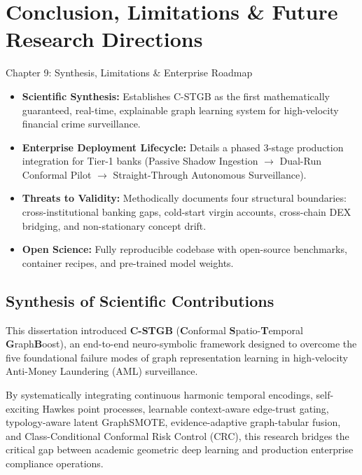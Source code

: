 \chapter{Conclusion, Limitations \& Future Research Directions}
\label{ch:conclusion}

\begin{takeawaybox}{Chapter 9: Synthesis, Limitations \& Enterprise Roadmap}
\begin{itemize}\setlength{\itemsep}{1pt}
  \item \textbf{Scientific Synthesis:} Establishes C-STGB as the first mathematically guaranteed, real-time, explainable graph learning system for high-velocity financial crime surveillance.
  \item \textbf{Enterprise Deployment Lifecycle:} Details a phased 3-stage production integration for Tier-1 banks (Passive Shadow Ingestion $\rightarrow$ Dual-Run Conformal Pilot $\rightarrow$ Straight-Through Autonomous Surveillance).
  \item \textbf{Threats to Validity:} Methodically documents four structural boundaries: cross-institutional banking gaps, cold-start virgin accounts, cross-chain DEX bridging, and non-stationary concept drift.
  \item \textbf{Open Science:} Fully reproducible codebase with open-source benchmarks, container recipes, and pre-trained model weights.
\end{itemize}
\end{takeawaybox}


\section{Synthesis of Scientific Contributions}
This dissertation introduced \textbf{C-STGB} (\textbf{C}onformal \textbf{S}patio-\textbf{T}emporal \textbf{G}raph\textbf{B}oost), an end-to-end neuro-symbolic framework designed to overcome the five foundational failure modes of graph representation learning in high-velocity Anti-Money Laundering (AML) surveillance.

By systematically integrating continuous harmonic temporal encodings, self-exciting Hawkes point processes, learnable context-aware edge-trust gating, typology-aware latent GraphSMOTE, evidence-adaptive graph-tabular fusion, and Class-Conditional Conformal Risk Control (CRC), this research bridges the critical gap between academic geometric deep learning and production enterprise compliance operations.

